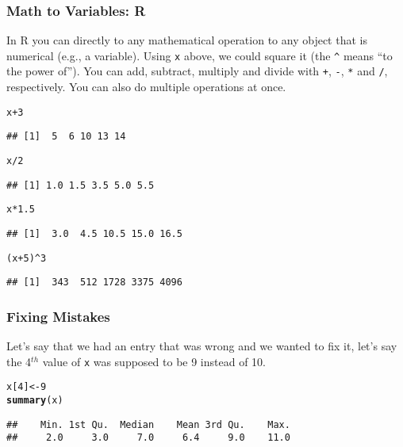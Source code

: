 \documentclass[slidestop,compress,mathserif]{beamer}\usepackage[]{graphicx}\usepackage[]{color}
\makeatletter
\newcommand{\hlnum}[1]{\textcolor[rgb]{0.686,0.059,0.569}{#1}}%
\newcommand{\hlopt}[1]{\textcolor[rgb]{0,0,0}{#1}}%
\newcommand{\hlstd}[1]{\textcolor[rgb]{0.345,0.345,0.345}{#1}}%
\newcommand{\hlkwb}[1]{\textcolor[rgb]{0.69,0.353,0.396}{#1}}%
\newcommand{\hlkwd}[1]{\textcolor[rgb]{0.737,0.353,0.396}{\textbf{#1}}}%
\newenvironment{kframe}{%
 \def\at@end@of@kframe{}%
 \ifinner\ifhmode%
  \def\at@end@of@kframe{\end{minipage}}%
  \begin{minipage}{\columnwidth}%
 \fi\fi%
 \def\FrameCommand##1{\hskip\@totalleftmargin \hskip-\fboxsep
 \colorbox{shadecolor}{##1}\hskip-\fboxsep
     \hskip-\linewidth \hskip-\@totalleftmargin \hskip\columnwidth}%
 \MakeFramed {\advance\hsize-\width
   \@totalleftmargin\z@ \linewidth\hsize
   \@setminipage}}%
 {\par\unskip\endMakeFramed%
 \at@end@of@kframe}
\newenvironment{knitrout}{}{} %
\makeatother
\begin{document}
\begin{frame}[fragile]

\frametitle{Math to Variables: R}

In R you can directly to any mathematical operation to any object that is numerical (e.g., a variable).  Using \verb"x" above, we could square it (the \verb"^" means ``to the power of'').  You can add, subtract, multiply and divide with \verb"+", \verb"-", \verb"*" and \verb"/", respectively.  You can also do multiple operations at once. 
\begin{scriptsize}
\begin{knitrout}
\color{fgcolor}\begin{kframe}
\begin{alltt}
\hlstd{x} \hlopt{+} \hlnum{3}
\end{alltt}
\begin{verbatim}
## [1]  5  6 10 13 14
\end{verbatim}
\begin{alltt}
\hlstd{x}\hlopt{/}\hlnum{2}
\end{alltt}
\begin{verbatim}
## [1] 1.0 1.5 3.5 5.0 5.5
\end{verbatim}
\begin{alltt}
\hlstd{x}\hlopt{*}\hlnum{1.5}
\end{alltt}
\begin{verbatim}
## [1]  3.0  4.5 10.5 15.0 16.5
\end{verbatim}
\begin{alltt}
\hlstd{(x}\hlopt{+}\hlnum{5}\hlstd{)}\hlopt{^}\hlnum{3}
\end{alltt}
\begin{verbatim}
## [1]  343  512 1728 3375 4096
\end{verbatim}
\end{kframe}
\end{knitrout}
\end{scriptsize}
\end{frame}

\begin{frame}[fragile]

\frametitle{Fixing Mistakes}

Let's say that we had an entry that was wrong and we wanted to fix it, let's say the 4$^{th}$ value of \verb"x" was supposed to be 9 instead of 10.  

\begin{knitrout}
\color{fgcolor}\begin{kframe}
\begin{alltt}
\hlstd{x[}\hlnum{4}\hlstd{]} \hlkwb{<-} \hlnum{9}
\hlkwd{summary}\hlstd{(x)}
\end{alltt}
\begin{verbatim}
##    Min. 1st Qu.  Median    Mean 3rd Qu.    Max. 
##     2.0     3.0     7.0     6.4     9.0    11.0
\end{verbatim}
\end{kframe}
\end{knitrout}

\end{frame}
\end{document}
